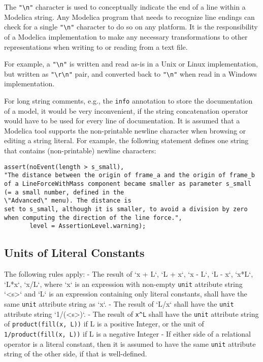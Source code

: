 The \lstinline!"\n"! character is used to conceptually indicate the
end of a line within a Modelica string. Any Modelica program that needs
to recognize line endings can check for a single \lstinline!"\n"!
character to do so on any platform. It is the responsibility of a
Modelica implementation to make any necessary transformations to other
representations when writing to or reading from a text file.

\begin{nonnormative}
For example, a \lstinline!"\n"! is written and read as-is in a Unix or Linux implementation, but written as
\lstinline!"\r\n"! pair, and converted back to \lstinline!"\n"! when read in a Windows implementation.
\end{nonnormative}

\begin{nonnormative}
For long string comments, e.g., the \lstinline!info! annotation to
store the documentation of a model, it would be very inconvenient, if
the string concatenation operator would have to be used for every line
of documentation. It is assumed that a Modelica tool supports the
non-printable newline character when browsing or editing a string
literal. For example, the following statement defines one string that
contains (non-printable) newline characters:
\begin{lstlisting}[language=modelica]
assert(noEvent(length > s_small),
"The distance between the origin of frame_a and the origin of frame_b
of a LineForceWithMass component became smaller as parameter s_small
(= a small number, defined in the
\"Advanced\" menu). The distance is
set to s_small, although it is smaller, to avoid a division by zero
when computing the direction of the line force.",
       level = AssertionLevel.warning);
\end{lstlisting}
\end{nonnormative}

\subsection{Units of Literal Constants}\label{units-literal-constants}

The following rules apply:
- The result of `x + L`, `L + x`, `x - L`, `L - x`, `x*L`, `L*x`, `x/L`, where `x` is an expression with non-empty \lstinline!unit! attribute string `<s>` and `L` is an expression containing only literal constants, shall have the same \lstinline!unit! attribute string as `x`.
- The result of `L/x` shall have the \lstinline!unit! attribute string `1/(<s>)`.
- The result of \lstinline!x^L! shall have the \lstinline!unit! attribute string of \lstinline!product(fill(x, L))! if L is a positive Integer, or the unit of \lstinline!1/product(fill(x, L))! if L is a negative Integer
- If either side of a relational operator is a literal constant, then it is assumed to have the same \lstinline!unit! attribute string of the other side, if that is well-defined.

